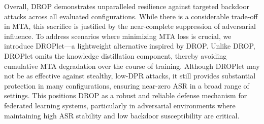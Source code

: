  Overall, DROP demonstrates unparalleled resilience against targeted backdoor attacks across all evaluated configurations. While there is a considerable trade-off in MTA, this sacrifice is justified by the near-complete suppression of adversarial influence. 
To address scenarios where minimizing MTA loss is crucial, we introduce DROPlet—a lightweight alternative inspired by DROP. Unlike DROP, DROPlet omits the knowledge distillation component, thereby avoiding cumulative MTA degradation over the course of training. Although DROPlet may not be as effective against stealthy, low-DPR attacks, it still provides substantial protection in many configurations, ensuring near-zero ASR in a broad range of settings. This positions DROP as a robust and reliable defense mechanism for federated learning systems, particularly in adversarial environments where maintaining high ASR stability and low backdoor susceptibility are critical.



